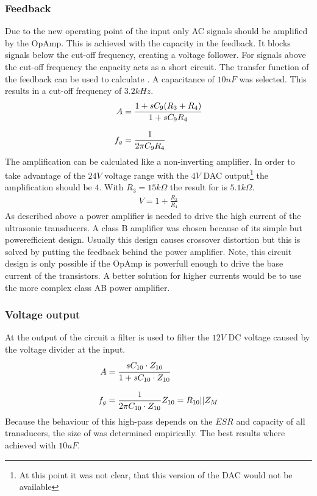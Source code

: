 \subsubsection*{Feedback}
%
Due to the new operating point of the input only AC signals should be amplified by the OpAmp. This is achieved with the capacity  in the feedback. It blocks signals below the cut-off frequency, creating a voltage follower. For signals above the cut-off frequency the capacity  acts as a short circuit. The transfer function of the feedback can be used to calculate . A capacitance of $10nF$ was selected. This results in a cut-off frequency of $3.2kHz$.
%
\begin{align}
  A &= \frac{1 + s C_9 (R_3 + R_4)}{1 + s C_9 R_4}\pmath
  f_g &= \frac{1}{2 \pi C_9 R_4}
\end{align}
%
The amplification can be calculated like a non-inverting amplifier. In order to take advantage of the $24V$ voltage range with the $4V$ DAC output\footnote{At this point it was not clear, that this version of the DAC would not be available} the amplification should be $4$. With $R_3 = 15k\Omega$ the result for  is $5.1k\Omega$.
%
\begin{align}
  V = 1 + \frac{R_3}{R_4}
\end{align}
%
As described above a power amplifier is needed to drive the high current of the ultrasonic transducers. A class B amplifier was chosen because of its simple but powerefficient design.\cite{okorn_halbleiterschaltung_2020} Usually this design causes crossover distortion but this is solved by putting the feedback behind the power amplifier. Note, this circuit design is only possible if the OpAmp is powerfull enough to drive the base current of the transistors. A better solution for higher currents would be to use the more complex class AB power amplifier.
\subsubsection*{Voltage output}
At the output of the circuit a   filter is used to filter the $12V$ DC voltage caused by the voltage divider at the input.
%
\begin{align}
  A &= \cfrac{sC_{10} \cdot Z_{10}}{1 + sC_{10} \cdot Z_{10}} \pmath
  f_g &= \frac{1}{2 \pi C_{10} \cdot Z_{10}}
  Z_{10} = R_{10} || Z_M
\end{align}
%
Because the behaviour of this high-pass depends on the $ESR$ and capacity of all transducers, the size of  was determined empirically. The best results where achieved with $10uF$.

